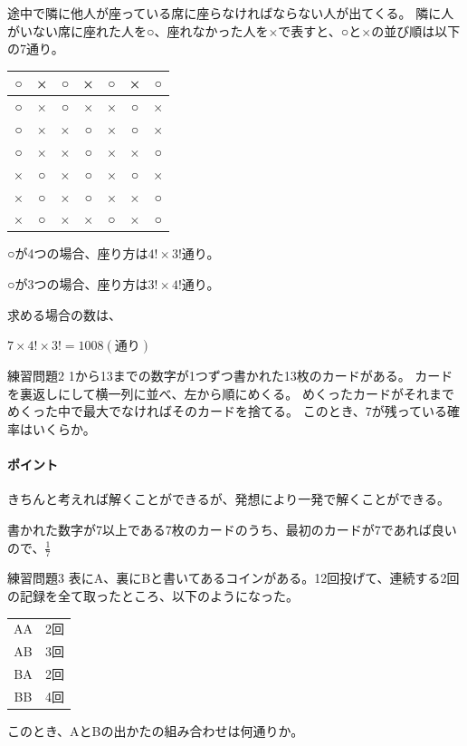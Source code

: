 \documentclass[uplatex,fleqn]{jsbook}
\begin{document}
\begin{answer}
    途中で隣に他人が座っている席に座らなければならない人が出てくる。
    隣に人がいない席に座れた人を○、座れなかった人を×で表すと、○と×の並び順は以下の7通り。

    \begin{tabular}{|ccccccc|}
        \hline
        ○ & × & ○ & × & ○ & × & ○\\\hline
        ○ & × & ○ & × & × & ○ & ×\\\hline
        ○ & × & × & ○ & × & ○ & ×\\\hline
        ○ & × & × & ○ & × & × & ○\\\hline
        × & ○ & × & ○ & × & ○ & ×\\\hline
        × & ○ & × & ○ & × & × & ○\\\hline
        × & ○ & × & × & ○ & × & ○\\\hline
    \end{tabular}

    ○が4つの場合、座り方は$4!\times 3!$通り。

    ○が3つの場合、座り方は$3!\times 4!$通り。

    求める場合の数は、

    $7\times 4!\times 3!=1008(通り)$
\end{answer}

\begin{problem}{練習問題2}
    1から13までの数字が1つずつ書かれた13枚のカードがある。
    カードを裏返しにして横一列に並べ、左から順にめくる。
    めくったカードがそれまでめくった中で最大でなければそのカードを捨てる。
    このとき、7が残っている確率はいくらか。
\end{problem}

\paragraph{ポイント}きちんと考えれば解くことができるが、発想により一発で解くことができる。

\begin{answer}
    書かれた数字が7以上である7枚のカードのうち、最初のカードが7であれば良いので、$\displaystyle\frac{1}{7}$
\end{answer}

\begin{problem}{練習問題3}
    表にA、裏にBと書いてあるコインがある。12回投げて、連続する2回の記録を全て取ったところ、以下のようになった。

    \begin{tabular}{cc}
        AA & 2回\\
        AB & 3回\\
        BA & 2回\\
        BB & 4回\\
    \end{tabular}

    このとき、AとBの出かたの組み合わせは何通りか。
\end{problem}
\end{document}
